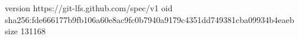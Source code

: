 version https://git-lfs.github.com/spec/v1
oid sha256:fde666177b9fb106a60e8ac9fc0b7940a9179c4351dd749381cba09934b4eaeb
size 131168
